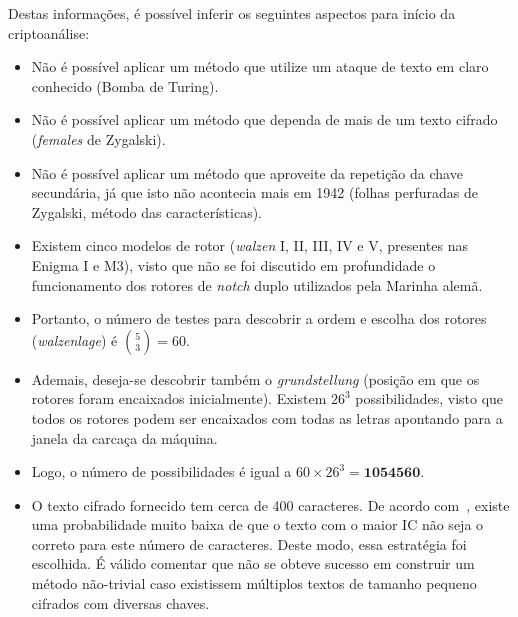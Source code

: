\documentclass{../sftex/sftex}
\begin{document}
Destas informações, é possível inferir os seguintes aspectos para início da
criptoanálise:

\begin{itemize}

    \item Não é possível aplicar um método que utilize um ataque de texto em
        claro conhecido (Bomba de Turing).

    \item Não é possível aplicar um método que dependa de mais de um texto
        cifrado (\textit{females} de Zygalski).

    \item Não é possível aplicar um método que aproveite da repetição da chave
        secundária, já que isto não acontecia mais em 1942 (folhas perfuradas
        de Zygalski, método das características).

    \item Existem cinco modelos de rotor (\textit{walzen} I, II, III, IV e V,
        presentes nas Enigma I e M3), visto que não se foi discutido em
        profundidade o funcionamento dos rotores de \textit{notch} duplo
        utilizados pela Marinha alemã.

    \item Portanto, o número de testes para descobrir a ordem e escolha dos
        rotores (\textit{walzenlage}) é $\binom{5}{3} = 60$.

    \item Ademais, deseja-se descobrir também o \textit{grundstellung}
        (posição em que os rotores foram encaixados inicialmente). Existem
        $26^3$ possibilidades, visto que todos os rotores podem ser encaixados
        com todas as letras apontando para a janela da carcaça da máquina.

    \item Logo, o número de possibilidades é igual a
        $60 \times 26^3 = \textbf{1054560}$.

    \item O texto cifrado fornecido tem cerca de 400 caracteres. De acordo
        com~\cite{enigmaIC}, existe uma probabilidade muito baixa de que o texto
        com o maior IC não seja o correto para este número de caracteres. Deste
        modo, essa estratégia foi escolhida. É válido comentar que não se
        obteve sucesso em construir um método não-trivial caso existissem
        múltiplos textos de tamanho pequeno cifrados com diversas chaves.

\end{itemize}
\end{document}
